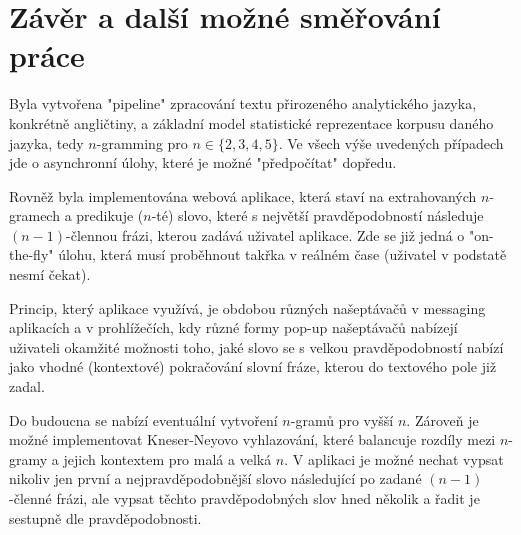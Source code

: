 
\section{Závěr a další možné směřování práce}

Byla vytvořena "pipeline" zpracování textu přirozeného analytického jazyka,
konkrétně angličtiny, a základní model statistické reprezentace
korpusu 
daného jazyka, tedy $n$-gramming pro $n \in \{2, 3, 4, 5\}$.
Ve všech výše
uvedených případech jde o asynchronní úlohy, které je
možné "předpočítat" dopředu.

Rovněž byla implementována webová aplikace, která staví na extrahovaných
\mbox{$n$-gramech} a predikuje ($n$-té) slovo,
které s největší pravděpodobností
následuje \mbox{$(n - 1)$-člennou} frázi, kterou zadává
uživatel aplikace. Zde
se již jedná o \mbox{"on-the-fly"} úlohu, která musí proběhnout
takřka v reálném
čase (uživatel v podstatě nesmí čekat).

Princip, který aplikace využívá, je obdobou různých našeptávačů v messaging
aplikacích a v prohlížečích, kdy různé formy pop-up našeptávačů nabízejí
uživateli okamžité možnosti toho, jaké slovo se s velkou pravděpodobností%
nabízí jako vhodné (kontextové) pokračování slovní fráze, kterou do textového
pole již zadal.

Do budoucna se nabízí eventuální vytvoření $n$-gramů pro vyšší $n$.
Zároveň je možné implementovat Kneser-Neyovo vyhlazování,
které balancuje
rozdíly mezi \mbox{$n$-gramy} a jejich kontextem pro malá a velká $n$.
V aplikaci
je možné nechat vypsat nikoliv jen první a nejpravděpodobnější slovo
následující po zadané $(n - 1)$-členné frázi,
ale vypsat těchto pravděpodobných
slov hned několik a řadit je sestupně dle pravděpodobnosti.


\newpage







